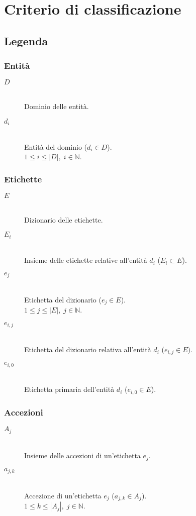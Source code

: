 \chapter{Criterio di classificazione}
\label{ch:appendice:classificazione}

\section*{Legenda}

\subsection*{Entità}
\begin{description}
	\item[$D$] \hfill \\
	Dominio delle entità.
	\item[$d_i$] \hfill \\
	Entità del dominio ($d_i \in D$).\\
	$1 \leq i \leq \left|D\right|,\; i \in \mathbb{N}$.
\end{description}	

\subsection*{Etichette}
\begin{description}
	\item[$E$] \hfill \\
	Dizionario delle etichette.
	\item[$E_i$] \hfill \\
	Insieme delle etichette relative all'entità $d_i$ ($E_i \subset E$).
	\item[$e_j$] \hfill \\
	Etichetta del dizionario ($e_j \in E$).\\
	$1 \leq j \leq \left|E\right|,\; j \in \mathbb{N}$.
	\item[$e_{i,j}$] \hfill \\
	Etichetta del dizionario relativa all'entità $d_i$ ($e_{i,j} \in E$).
	\item[$e_{i,0}$] \hfill \\
	Etichetta primaria dell'entità $d_i$ ($e_{i,0} \in E$).
\end{description}

\subsection*{Accezioni}
\begin{description}
	\item[$A_j$] \hfill \\
	Insieme delle accezioni di un'etichetta $e_j$.
	\item[$a_{j,k}$] \hfill \\
	Accezione di un'etichetta $e_j$ ($a_{j,k} \in A_j$).\\
	$1 \leq k \leq \left|A_j\right|,\; j \in \mathbb{N}$.
\end{description}

